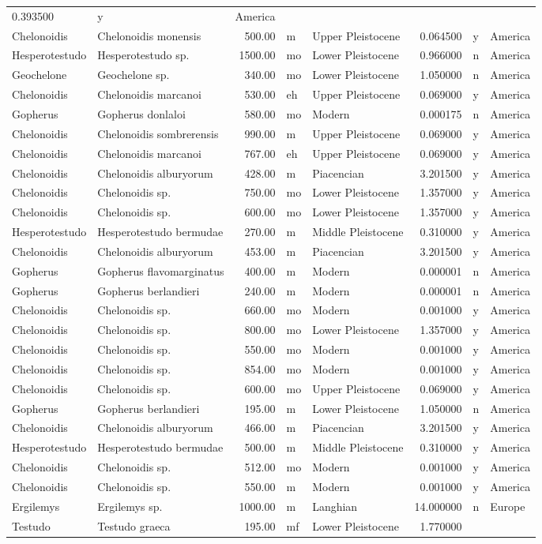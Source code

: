 \documentclass[]{article}
\begin{document}
\begin{longtable}[]{@{}llrllrll@{}}
0.393500 & y & America\tabularnewline
Chelonoidis & Chelonoidis monensis & 500.00 & m & Upper Pleistocene &
0.064500 & y & America\tabularnewline
Hesperotestudo & Hesperotestudo sp. & 1500.00 & mo & Lower Pleistocene &
0.966000 & n & America\tabularnewline
Geochelone & Geochelone sp. & 340.00 & mo & Lower Pleistocene & 1.050000
& n & America\tabularnewline
Chelonoidis & Chelonoidis marcanoi & 530.00 & eh & Upper Pleistocene &
0.069000 & y & America\tabularnewline
Gopherus & Gopherus donlaloi & 580.00 & mo & Modern & 0.000175 & n &
America\tabularnewline
Chelonoidis & Chelonoidis sombrerensis & 990.00 & m & Upper Pleistocene
& 0.069000 & y & America\tabularnewline
Chelonoidis & Chelonoidis marcanoi & 767.00 & eh & Upper Pleistocene &
0.069000 & y & America\tabularnewline
Chelonoidis & Chelonoidis alburyorum & 428.00 & m & Piacencian &
3.201500 & y & America\tabularnewline
Chelonoidis & Chelonoidis sp. & 750.00 & mo & Lower Pleistocene &
1.357000 & y & America\tabularnewline
Chelonoidis & Chelonoidis sp. & 600.00 & mo & Lower Pleistocene &
1.357000 & y & America\tabularnewline
Hesperotestudo & Hesperotestudo bermudae & 270.00 & m & Middle
Pleistocene & 0.310000 & y & America\tabularnewline
Chelonoidis & Chelonoidis alburyorum & 453.00 & m & Piacencian &
3.201500 & y & America\tabularnewline
Gopherus & Gopherus flavomarginatus & 400.00 & m & Modern & 0.000001 & n
& America\tabularnewline
Gopherus & Gopherus berlandieri & 240.00 & m & Modern & 0.000001 & n &
America\tabularnewline
Chelonoidis & Chelonoidis sp. & 660.00 & mo & Modern & 0.001000 & y &
America\tabularnewline
Chelonoidis & Chelonoidis sp. & 800.00 & mo & Lower Pleistocene &
1.357000 & y & America\tabularnewline
Chelonoidis & Chelonoidis sp. & 550.00 & mo & Modern & 0.001000 & y &
America\tabularnewline
Chelonoidis & Chelonoidis sp. & 854.00 & mo & Modern & 0.001000 & y &
America\tabularnewline
Chelonoidis & Chelonoidis sp. & 600.00 & mo & Upper Pleistocene &
0.069000 & y & America\tabularnewline
Gopherus & Gopherus berlandieri & 195.00 & m & Lower Pleistocene &
1.050000 & n & America\tabularnewline
Chelonoidis & Chelonoidis alburyorum & 466.00 & m & Piacencian &
3.201500 & y & America\tabularnewline
Hesperotestudo & Hesperotestudo bermudae & 500.00 & m & Middle
Pleistocene & 0.310000 & y & America\tabularnewline
Chelonoidis & Chelonoidis sp. & 512.00 & mo & Modern & 0.001000 & y &
America\tabularnewline
Chelonoidis & Chelonoidis sp. & 550.00 & m & Modern & 0.001000 & y &
America\tabularnewline
Ergilemys & Ergilemys sp. & 1000.00 & m & Langhian & 14.000000 & n &
Europe\tabularnewline
Testudo & Testudo graeca & 195.00 & mf & Lower Pleistocene & 1.770000 &

\end{longtable}
\end{document}
